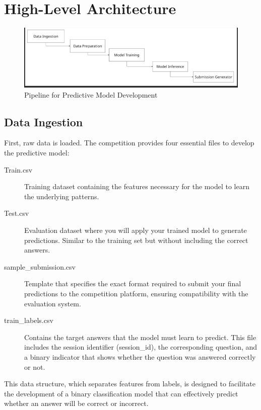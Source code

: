 \documentclass{article}
\begin{document}
\section{High-Level Architecture}

\begin{figure}[H]
    \centering
    \includegraphics[width=\textwidth]{src/image.png}
    \caption{Pipeline for Predictive Model Development}
\end{figure}
    
\subsection*{Data Ingestion}

First, raw data is loaded. The competition provides four essential files to develop the predictive model:

\begin{description}
  \item[Train.csv] Training dataset containing the features necessary for the model to learn the underlying patterns.
  
  \item[Test.csv] Evaluation dataset where you will apply your trained model to generate predictions. Similar to the training set but without including the correct answers.
  
  \item[sample\_submission.csv] Template that specifies the exact format required to submit your final predictions to the competition platform, ensuring compatibility with the evaluation system.
  
  \item[train\_labels.csv] Contains the target answers that the model must learn to predict. This file includes the session identifier (session\_id), the corresponding question, and a binary indicator that shows whether the question was answered correctly or not.
\end{description}

This data structure, which separates features from labels, is designed to facilitate the development of a binary classification model that can effectively predict whether an answer will be correct or incorrect.
\end{document}
